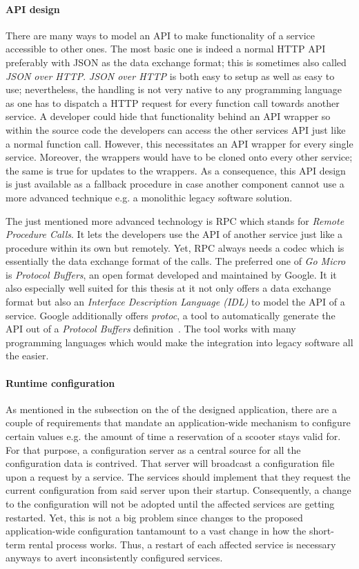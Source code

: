 \documentclass[12pt,a4paper,twoside]{report}
\begin{document}
\paragraph{API design} \label{construction-api_design}
There are many ways to model an API to make functionality of a service accessible
to other ones. The most basic one is indeed a normal HTTP API preferably with
JSON as the data exchange format; this is sometimes also called \textit{JSON over HTTP}.
\textit{JSON over HTTP} is both easy to setup as well as easy to use;
nevertheless, the handling is not very native to any programming language as one
has to dispatch a HTTP request for every function call towards another service.
A developer could hide that functionality behind an API wrapper so within the
source code the developers can access the other services API just like a normal
function call. However, this necessitates an API wrapper for every single service.
Moreover, the wrappers would have to be cloned onto every other service;
the same is true for updates to the wrappers.
As a consequence, this API design is just available as a fallback procedure
in case another component cannot use a more advanced technique e.g. a monolithic
legacy software solution.

The just mentioned more advanced technology is RPC which stands for
\textit{Remote Procedure Calls}.
It lets the developers use the API of another service just like a procedure within
its own but remotely. Yet, RPC always needs a codec which is essentially the
data exchange format of the calls. The preferred one of \textit{Go Micro}
is \textit{Protocol Buffers}, an open format developed and maintained by Google.
It it also especially well suited for this thesis at it not only offers a
data exchange format but also an \textit{Interface Description Language (IDL)}
to model the API of a service. Google additionally offers \textit{protoc},
a tool to automatically generate the API out of a \textit{Protocol Buffers}
definition~\cite{protobuf}. The tool works with many programming languages
which would make the integration into legacy software all the easier.

\paragraph{Runtime configuration}
As mentioned in the subsection on the \textit{}
of the designed application, there are a couple of requirements that
mandate an application-wide mechanism to configure certain values e.g.
the amount of time a reservation of a scooter stays valid for.
For that purpose, a configuration server as a central source for all the
configuration data is contrived. That server will broadcast a configuration file
upon a request by a service. The services should implement that they request
the current configuration from said server upon their startup. Consequently,
a change to the configuration will not be adopted until the affected services
are getting restarted. Yet, this is not a big problem since changes to the proposed
application-wide configuration tantamount to a vast change in how the
short-term rental process works. Thus, a restart of each affected service is
necessary anyways to avert inconsistently configured services.
\end{document}

